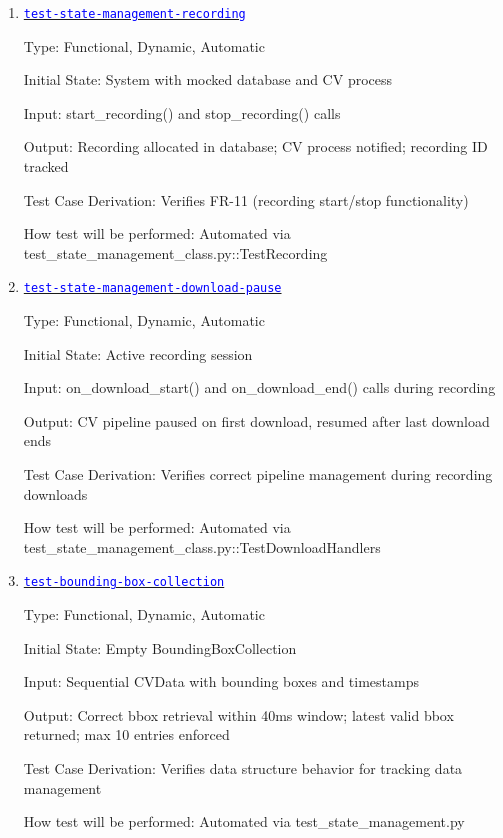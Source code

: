 \documentclass[12pt, titlepage]{article}
\newcommand{\tid}[1]{\hyperlink{tid:#1}{\textcolor{blue}{\texttt{#1}}}}
\begin{document}
\begin{enumerate}
        How test will be performed: Automated via
        test\_state\_management\_class.py::TestManualMove

  \item{\tid{test-state-management-recording}\\}

        Type: Functional, Dynamic, Automatic

        Initial State: System with mocked database and CV process

        Input: start\_recording() and stop\_recording() calls

        Output: Recording allocated in database; CV process notified; recording ID
        tracked

        Test Case Derivation: Verifies FR-11 (recording start/stop functionality)

        How test will be performed: Automated via
        test\_state\_management\_class.py::TestRecording

  \item{\tid{test-state-management-download-pause}\\}

        Type: Functional, Dynamic, Automatic

        Initial State: Active recording session

        Input: on\_download\_start() and on\_download\_end() calls during recording

        Output: CV pipeline paused on first download, resumed after last download ends

        Test Case Derivation: Verifies correct pipeline management during recording
        downloads

        How test will be performed: Automated via
        test\_state\_management\_class.py::TestDownloadHandlers

  \item{\tid{test-bounding-box-collection}\\}

        Type: Functional, Dynamic, Automatic

        Initial State: Empty BoundingBoxCollection

        Input: Sequential CVData with bounding boxes and timestamps

        Output: Correct bbox retrieval within 40ms window; latest valid bbox returned;
        max 10 entries enforced

        Test Case Derivation: Verifies data structure behavior for tracking data
        management

        How test will be performed: Automated via test\_state\_management.py

\end{enumerate}
\end{document}
